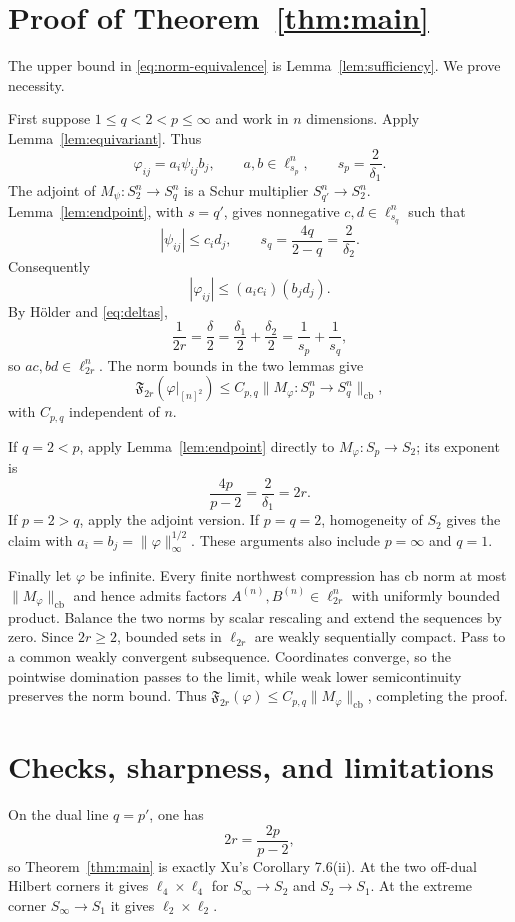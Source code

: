 \documentclass[11pt]{article}
\newcommand{\cb}{\mathrm{cb}}
\newcommand{\F}{\mathfrak F}
\begin{document}
\section{Proof of Theorem~\ref{thm:main}}

The upper bound in \eqref{eq:norm-equivalence} is
Lemma~\ref{lem:sufficiency}.  We prove necessity.

First suppose $1\le q<2<p\le\infty$ and work in $n$ dimensions.  Apply
Lemma~\ref{lem:equivariant}.  Thus
\[
 \varphi_{ij}=a_i\psi_{ij}b_j,
 \qquad a,b\in\ell_{s_p}^n,
 \qquad s_p=\frac2{\delta_1}.
\]
The adjoint of $M_\psi:S_2^n\to S_q^n$ is a Schur multiplier
$S_{q'}^n\to S_2^n$.  Lemma~\ref{lem:endpoint}, with $s=q'$, gives
nonnegative $c,d\in\ell_{s_q}^n$ such that
\[
 |\psi_{ij}|\le c_i d_j,
 \qquad s_q=\frac{4q}{2-q}=\frac2{\delta_2}.
\]
Consequently
\[
 |\varphi_{ij}|\le (a_ic_i)(b_jd_j).
\]
By H\"older and \eqref{eq:deltas},
\[
 \frac1{2r}=\frac\delta2
 =\frac{\delta_1}{2}+\frac{\delta_2}{2}
 =\frac1{s_p}+\frac1{s_q},
\]
so $ac,bd\in\ell_{2r}^n$.  The norm bounds in the two lemmas give
\[
 \F_{2r}(\varphi|_{[n]^2})
 \le C_{p,q}\|M_\varphi:S_p^n\to S_q^n\|_{\cb},
\]
with $C_{p,q}$ independent of $n$.

If $q=2<p$, apply Lemma~\ref{lem:endpoint} directly to
$M_\varphi:S_p\to S_2$; its exponent is
\[
 \frac{4p}{p-2}=\frac2{\delta_1}=2r.
\]
If $p=2>q$, apply the adjoint version.  If $p=q=2$, homogeneity of $S_2$
gives the claim with $a_i=b_j=\|\varphi\|_\infty^{1/2}$.  These arguments
also include $p=\infty$ and $q=1$.

Finally let $\varphi$ be infinite.  Every finite northwest compression has
cb norm at most $\|M_\varphi\|_{\cb}$ and hence admits factors
$A^{(n)},B^{(n)}\in\ell_{2r}^n$ with uniformly bounded product.  Balance the
two norms by scalar rescaling and extend the sequences by zero.  Since
$2r\ge2$, bounded sets in $\ell_{2r}$ are weakly sequentially compact.
Pass to a common weakly convergent subsequence.  Coordinates converge, so
the pointwise domination passes to the limit, while weak lower
semicontinuity preserves the norm bound.  Thus
$\F_{2r}(\varphi)\le C_{p,q}\|M_\varphi\|_{\cb}$, completing the proof.

\section{Checks, sharpness, and limitations}

On the dual line $q=p'$, one has
\[
 2r=\frac{2p}{p-2},
\]
so Theorem~\ref{thm:main} is exactly Xu's Corollary 7.6(ii).  At the two
off-dual Hilbert corners it gives $\ell_4\times\ell_4$ for
$S_\infty\to S_2$ and $S_2\to S_1$.  At the extreme corner
$S_\infty\to S_1$ it gives $\ell_2\times\ell_2$.
\end{document}
